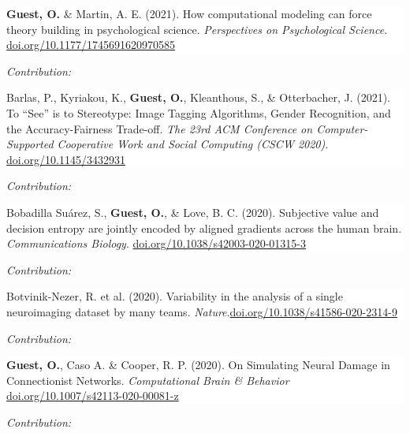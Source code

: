 \documentclass[10pt]{article}
\newcommand{\paper}[2]{\colorbox{white}{\begin{minipage}{\dimexpr\linewidth-2\fboxsep}#1
\end{minipage}}
\if\relax\detokenize{#2}\relax
    \vspace{2pt}
    \else
    \begin{flushright}
    \begin{minipage}{0.99\dimexpr\linewidth-2\fboxsep}\small
    \emph{Contribution:} #2
    \end{minipage}
    \end{flushright}
\fi
}
\begin{document}
\paper{
\textbf{Guest, O.} \& Martin, A. E. (2021).  How computational modeling can force theory building in psychological science. \textit{Perspectives on Psychological Science}.\newline
 \href{https://doi.org/10.1177/1745691620970585}{doi.org/10.1177/1745691620970585}
}{}

\paper{
Barlas, P., Kyriakou, K., \textbf{Guest, O.}, Kleanthous, S., \& Otterbacher, J. (2021). {To ``See'' is to Stereotype: Image Tagging Algorithms, Gender Recognition, and the Accuracy-Fairness Trade-off}. \textit{The 23rd ACM Conference on Computer-Supported Cooperative Work and Social Computing (CSCW 2020)}. \newline\href{https://doi.org/10.1145/3432931}{doi.org/10.1145/3432931}
}{}


\paper{
Bobadilla Suárez, S., \textbf{Guest, O.}, \& Love, B. C. (2020).  {Subjective value and decision entropy are jointly encoded by aligned gradients across the human brain}. \textit{Communications Biology}.
\newline
\href{https://doi.org/10.1038/s42003-020-01315-3}{doi.org/10.1038/s42003-020-01315-3}
}
{}



\paper{Botvinik-Nezer, R. et al. (2020). {Variability in the analysis of a single neuroimaging dataset by many teams}. \textit{Nature}.\newline \href{https://doi.org/10.1038/s41586-020-2314-9}{doi.org/10.1038/s41586-020-2314-9}}
{}

\paper{
\textbf{Guest, O.}, Caso A. \& Cooper, R. P. (2020).  {On Simulating Neural Damage in Connectionist Networks}. \textit{Computational Brain \& Behavior} \newline
 \href{https://doi.org/10.1007/s42113-020-00081-z}{doi.org/10.1007/s42113-020-00081-z}}
 {}
\end{document}
